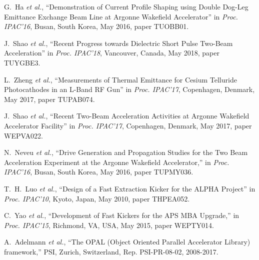 \documentclass[letterpaper,  %
              ]{jacow-2_3}   %
\begin{document}
\begin{thebibliography}{9}
G.~Ha \emph{et al.}, “Demonstration of Current Profile 
Shaping using Double Dog-Leg Emittance Exchange Beam 
Line at Argonne Wakefield Accelerator”
in \textit{Proc. IPAC’16}, 
Busan, South Korea, May 2016, 
paper TUOBB01.

J.~Shao \emph{et al.}, 
“Recent Progress towards Dielectric Short Pulse Two-Beam Acceleration”
in \textit{Proc. IPAC’18}, 
Vancouver, Canada, May 2018, 
paper TUYGBE3.

L.~Zheng \emph{et al.}, “Measurements of Thermal Emittance 
for Cesium Telluride Photocathodes in an L-Band RF Gun”
in \textit{Proc. IPAC’17}, 
Copenhagen, Denmark, May 2017, 
paper TUPAB074.

J.~Shao \emph{et al.}, “Recent Two-Beam 
Acceleration Activities at Argonne Wakefield Accelerator Facility”
in \textit{Proc. IPAC’17}, 
Copenhagen, Denmark, May 2017, 
paper WEPVA022.

N.~Neveu \emph{et al.}, 
“Drive Generation and Propagation Studies for the Two
Beam Acceleration Experiment at the Argonne Wakefield
Accelerator,”
in \emph{Proc. IPAC'16}, 
Busan, South Korea, May 2016, 
paper TUPMY036.

T.~H.~Luo \emph{et al.}, “Design of a Fast
Extraction Kicker for the ALPHA Project”
in \textit{Proc. IPAC’10}, 
Kyoto, Japan, May 2010, 
paper THPEA052.

C.~Yao \emph{et al.}, 
“Development of Fast Kickers for the APS
MBA Upgrade,”
in \emph{Proc. IPAC'15}, 
Richmond, VA, USA, May 2015, 
paper WEPTY014.

A.~Adelmann \emph{et al.},
“The OPAL (Object Oriented Parallel Accelerator Library) framework,”
PSI, Zurich, Switzerland,
Rep. PSI-PR-08-02, 2008-2017.

\end{thebibliography}
\end{document}
